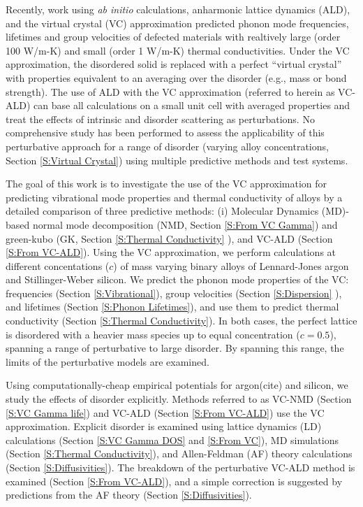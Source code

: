 \documentclass[aps,prb,onecolumn,preprint,superscriptaddress,amsmath,amssymb,floatfix]{revtex4}
\begin{document}
Recently, work using \emph{ab initio} calculations, anharmonic 
lattice dynamics (ALD), and the virtual crystal (VC) 
approximation predicted phonon mode frequencies, lifetimes and 
group velocities of defected materials with realtively
large (order 100 W/m-K\cite{garg_role_2011,lindsay_thermal_2012}) 
and 
small (order 1 W/m-K\cite{tian_phonon_2012}) 
thermal conductivities. 
Under the VC approximation, the disordered 
solid is replaced with a perfect “virtual crystal” with properties 
equivalent to an averaging over the disorder (e.g., mass or bond 
strength).\cite{abeles_lattice_1963}
The use of ALD with the VC approximation 
(referred to herein as VC-ALD) can base  
all calculations on a small unit cell with averaged properties and 
treat the effects of intrinsic and disorder scattering as perturbations.
\cite{abeles_lattice_1963,tamura_isotope_1983,
tian_phonon_2012,lindsay_thermal_2012} 
No comprehensive study has been performed 
to assess the applicability of this perturbative approach for a range 
of disorder (varying alloy concentrations, Section 
\ref{S:Virtual Crystal}) 
using multiple predictive methods and test systems.

The goal of this work is to investigate the use of the VC 
approximation for predicting vibrational mode properties and 
thermal conductivity of alloys by a detailed comparison 
of three predictive methods: (i) Molecular Dynamics (MD)-based 
normal mode 
decomposition (NMD, Section \ref{S:From VC Gamma}) 
and green-kubo (GK, Section \ref{S:Thermal Conductivity} ), 
and VC-ALD (Section \ref{S:From VC-ALD}). 
Using the VC approximation, 
we perform calculations at different concentations ($c$) 
of mass varying binary alloys of Lennard-Jones 
argon and Stillinger-Weber silicon. We predict 
the phonon mode properties of the VC:  
frequencies (Section \ref{S:Vibrational}), 
group velocities (Section \ref{S:Dispersion} ),  
and lifetimes (Section \ref{S:Phonon Lifetimes}), 
and use them to predict thermal
conductivity (Section \ref{S:Thermal Conductivity}). 
In both cases, the perfect lattice is 
disordered with a heavier mass species up to equal 
concentration ($c=0.5$), spanning 
a range of perturbative to large disorder. By spanning this range, 
the limits of the perturbative models are examined. 

Using computationally-cheap empirical potentials for argon(cite)  
and silicon\cite{stillinger_computer_1985},  
we study the effects of disorder explicitly. 
Methods referred to as VC-NMD (Section \ref{S:VC Gamma life})
and VC-ALD (Section \ref{S:From VC-ALD}) 
use the VC approximation. Explicit disorder 
is examined using lattice dynamics (LD) calculations 
(Section \ref{S:VC Gamma DOS} and \ref{S:From VC}), MD simulations 
(Section \ref{S:Thermal Conductivity}), 
and Allen-Feldman (AF) theory calculations  
(Section \ref{S:Diffusivities}).\cite{allen_thermal_1993} 
The breakdown of the perturbative VC-ALD method is examined 
(Section \ref{S:From VC-ALD}), 
and a simple correction is suggested by predictions from 
the AF theory (Section \ref{S:Diffusivities}).
\end{document}

